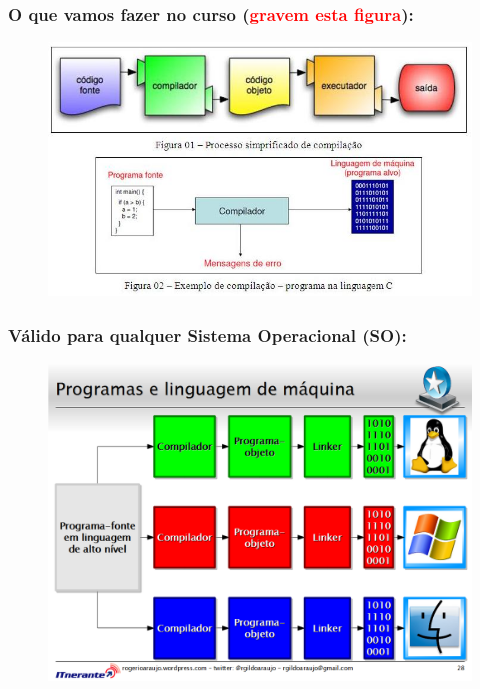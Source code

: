 \documentclass[10pt]{beamer}
\begin{document}
\begin{frame}[fragile]

\frametitle{O que vamos fazer no curso (\textcolor{red}{\textbf{gravem esta figura}}):}

\begin{figure}[!ht]
\centering
\includegraphics[height =.65\textheight,width=.8\textwidth]
{figuras/compilacao_01.jpg}
\end{figure}

\end{frame}


\begin{frame}[fragile]

\frametitle{Válido para qualquer Sistema Operacional (SO):}

\begin{figure}[!ht]
\centering
\includegraphics[height =.65\textheight,width=.8\textwidth]
{figuras/compilacao_02.png}
\end{figure}

\end{frame}
\end{document}
